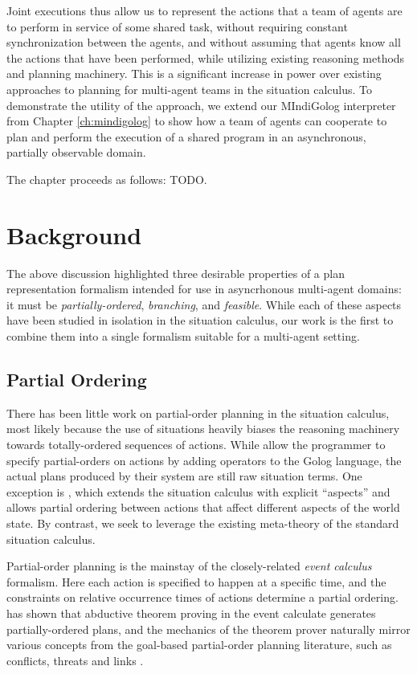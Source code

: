 Joint executions thus allow us to represent the actions that a team
of agents are to perform in service of some shared task, without requiring
constant synchronization between the agents, and without assuming
that agents know all the actions that have been performed, while utilizing
existing reasoning methods and planning machinery. This is a significant
increase in power over existing approaches to planning for multi-agent
teams in the situation calculus. To demonstrate the utility of the
approach, we extend our MIndiGolog interpreter from Chapter \ref{ch:mindigolog}
to show how a team of agents can cooperate to plan and perform the
execution of a shared program in an asynchronous, partially observable
domain.

The chapter proceeds as follows: TODO.


\section{Background\label{sec:JointExec:Background}}

The above discussion highlighted three desirable properties of a plan
representation formalism intended for use in asyncrhonous multi-agent
domains: it must be \emph{partially-ordered}, \emph{branching}, and
\emph{feasible}. While each of these aspects have been studied in
isolation in the situation calculus, our work is the first to combine
them into a single formalism suitable for a multi-agent setting.


\subsection{Partial Ordering}

There has been little work on partial-order planning in the situation
calculus, most likely because the use of situations heavily biases
the reasoning machinery towards totally-ordered sequences of actions.
While \citet{son00htn_golog} allow the programmer to specify partial-orders
on actions by adding operators to the Golog language, the actual plans
produced by their system are still raw situation terms. One exception
is \citep{plaisted97sc_aspect}, which extends the situation calculus
with explicit {}``aspects'' and allows partial ordering between
actions that affect different aspects of the world state. By contrast,
we seek to leverage the existing meta-theory of the standard situation
calculus.

Partial-order planning is the mainstay of the closely-related \emph{event
calculus} formalism. Here each action is specified to happen at a
specific time, and the constraints on relative occurrence times of
actions determine a partial ordering. \citet{Shanahan97ec_planning}
has shown that abductive theorem proving in the event calculate generates
partially-ordered plans, and the mechanics of the theorem prover naturally
mirror various concepts from the goal-based partial-order planning
literature, such as conflicts, threats and links \citep{peot92conditional_nonlinear}.

